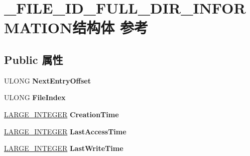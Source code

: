 \hypertarget{struct___f_i_l_e___i_d___f_u_l_l___d_i_r___i_n_f_o_r_m_a_t_i_o_n}{}\section{\+\_\+\+F\+I\+L\+E\+\_\+\+I\+D\+\_\+\+F\+U\+L\+L\+\_\+\+D\+I\+R\+\_\+\+I\+N\+F\+O\+R\+M\+A\+T\+I\+O\+N结构体 参考}
\label{struct___f_i_l_e___i_d___f_u_l_l___d_i_r___i_n_f_o_r_m_a_t_i_o_n}
\subsection*{Public 属性}
\begin{DoxyCompactItemize}
\item 
\mbox{\label{struct___f_i_l_e___i_d___f_u_l_l___d_i_r___i_n_f_o_r_m_a_t_i_o_n_a717083472d12c9ce468f3fa1c6be847e}} 
U\+L\+O\+NG {\bfseries Next\+Entry\+Offset}
\item 
\mbox{\label{struct___f_i_l_e___i_d___f_u_l_l___d_i_r___i_n_f_o_r_m_a_t_i_o_n_a43c4260ccd4902ea38e35a95a1c3cf3a}} 
U\+L\+O\+NG {\bfseries File\+Index}
\item 
\mbox{\label{struct___f_i_l_e___i_d___f_u_l_l___d_i_r___i_n_f_o_r_m_a_t_i_o_n_a654bf4e7903bf5b58a109cf04a313fb6}} 
\hyperlink{union___l_a_r_g_e___i_n_t_e_g_e_r}{L\+A\+R\+G\+E\+\_\+\+I\+N\+T\+E\+G\+ER} {\bfseries Creation\+Time}
\item 
\mbox{\label{struct___f_i_l_e___i_d___f_u_l_l___d_i_r___i_n_f_o_r_m_a_t_i_o_n_a4125c2004700d78bd3d5def5c205570b}} 
\hyperlink{union___l_a_r_g_e___i_n_t_e_g_e_r}{L\+A\+R\+G\+E\+\_\+\+I\+N\+T\+E\+G\+ER} {\bfseries Last\+Access\+Time}
\item 
\mbox{\label{struct___f_i_l_e___i_d___f_u_l_l___d_i_r___i_n_f_o_r_m_a_t_i_o_n_afea47300fbcea39d253d915ad05524d5}} 
\hyperlink{union___l_a_r_g_e___i_n_t_e_g_e_r}{L\+A\+R\+G\+E\+\_\+\+I\+N\+T\+E\+G\+ER} {\bfseries Last\+Write\+Time}

\end{DoxyCompactItemize}
